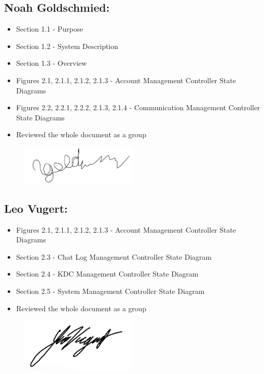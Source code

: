 \documentclass[]{article}
\begin{document}
\subsection*{Noah Goldschmied:}
\begin{itemize}
	\item Section 1.1 - Purpose
	\item Section 1.2 - System Description
	\item Section 1.3 - Overview
	\item Figures 2.1, 2.1.1, 2.1.2, 2.1.3 - Account Management Controller State Diagrams
	\item Figures 2.2, 2.2.1, 2.2.2, 2.1.3, 2.1.4 - Communication Management Controller State Diagrams
	\item Reviewed the whole document as a group
\end{itemize}
\begin{figure}[h]
	\centering
	\includegraphics[width=0.5\textwidth]{../images/NoahSignature.png}
	\label{fig:signature}
\end{figure}
\subsection*{Leo Vugert:}
\begin{itemize}
	\item Figures 2.1, 2.1.1, 2.1.2, 2.1.3 - Account Management Controller State Diagrams
	\item Section 2.3 - Chat Log Management Controller State Diagram
	\item Section 2.4 - KDC Management Controller State Diagram
	\item Section 2.5 - System Management Controller State Diagram
	\item Reviewed the whole document as a group
\end{itemize}
\begin{figure}[h]
	\centering
	\includegraphics[width=0.5\textwidth]{../images/LeoSignature.jpg}
	\label{fig:signature}
\end{figure}
\end{document}

